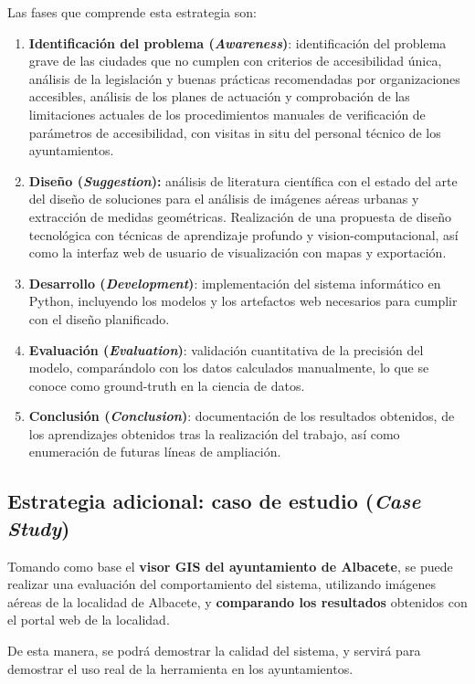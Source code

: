Las fases que comprende esta estrategia son:
\begin{enumerate}
    \item \textbf{Identificación del problema (\textit{Awareness})}: identificación del problema grave de las ciudades que no cumplen con criterios de accesibilidad única, análisis de la legislación y buenas prácticas recomendadas por organizaciones accesibles, análisis de los planes de actuación y comprobación de las limitaciones actuales de los procedimientos manuales de verificación de parámetros de accesibilidad, con visitas in situ del personal técnico de los ayuntamientos.
    \item \textbf{Diseño (\textit{Suggestion}):} análisis de literatura científica con el estado del arte del diseño de soluciones para el análisis de imágenes aéreas urbanas y extracción de medidas geométricas. Realización de una propuesta de diseño tecnológica con técnicas de aprendizaje profundo y \gls{vision-computacional}, así como la interfaz web de usuario de visualización con mapas y exportación.
    \item \textbf{Desarrollo (\textit{Development})}: implementación del sistema informático en Python, incluyendo los modelos y los artefactos web necesarios para cumplir con el diseño planificado.
    \item \textbf{Evaluación (\textit{Evaluation})}: validación cuantitativa de la precisión del modelo, comparándolo con los datos calculados manualmente, lo que se conoce como \gls{ground-truth} en la ciencia de datos.
    \item \textbf{Conclusión (\textit{Conclusion})}: documentación de los resultados obtenidos, de los aprendizajes obtenidos tras la realización del trabajo, así como enumeración de futuras líneas de ampliación.
\end{enumerate}

\subsection{Estrategia adicional: caso de estudio (\textit{Case Study})}

Tomando como base el \textbf{visor GIS del ayuntamiento de Albacete}, se puede realizar una evaluación del comportamiento del sistema, utilizando imágenes aéreas de la localidad de Albacete, y \textbf{comparando los resultados} obtenidos con el portal web de la localidad.

De esta manera, se podrá demostrar la calidad del sistema, y servirá para demostrar el uso real de la herramienta en los ayuntamientos.

